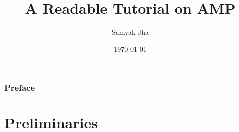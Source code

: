 \documentclass[english, 10pt, oneside]{book}
\title{A Readable Tutorial on AMP}
\author{Samyak Jha}
\date{\today}
\begin{document}
\maketitle
\tableofcontents

\section*{Preface}



\part{Preliminaries}



\printbibliography

\begin{warpprint} %
    \cleardoublepage %
\end{warpprint}

\ForceHTMLPage %
\ForceHTMLTOC %
\printindex
\end{document}
